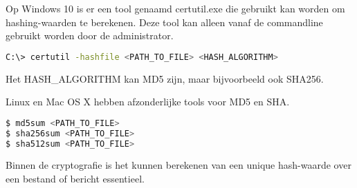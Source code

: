 Op Windows 10 is er een tool genaamd certutil.exe die gebruikt kan worden om hashing-waarden te berekenen. Deze tool kan alleen vanaf de commandline gebruikt worden door de administrator.

\begin{lstlisting}[language=bash]
C:\> certutil -hashfile <PATH_TO_FILE> <HASH_ALGORITHM>
\end{lstlisting}

Het HASH\_ALGORITHM kan MD5 zijn, maar bijvoorbeeld ook SHA256.

Linux en Mac OS X hebben afzonderlijke tools voor MD5 en SHA.
\begin{lstlisting}[language=bash]
$ md5sum <PATH_TO_FILE>
$ sha256sum <PATH_TO_FILE>
$ sha512sum <PATH_TO_FILE>
\end{lstlisting}

Binnen de cryptografie is het kunnen berekenen van een unique hash-waarde over een bestand of bericht essentieel.

